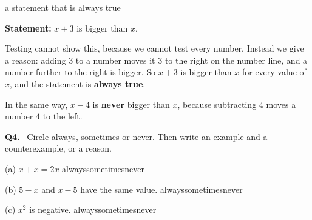 \documentclass[14pt,a4paper]{extarticle}
\newcommand{\qn}[1]{\textbf{Q#1.}\ }
\newcommand{\gapstrut}{\rule[-1.5mm]{0pt}{7.5mm}}
\newcommand{\writeline}{\par\gapstrut\underline{\hspace{\linewidth}}\par}
\newcommand{\statement}[1]{\textbf{Statement:} #1\par}
\newcommand{\circleone}{\hfill always\qquad sometimes\qquad never\par}
\begin{document}
\begin{wex}{a statement that is always true}
\begin{minipage}[t]{0.55\linewidth}
\vspace{0pt}\raggedright
\statement{$x+3$ is bigger than $x$.}
Testing cannot show this, because we cannot test every number. Instead
we give a reason: adding $3$ to a number moves it $3$ to the right on
the number line, and a number further to the right is bigger. So $x+3$
is bigger than $x$ for every value of $x$, and the statement is
\textbf{always true}.
\end{minipage}\hfill
\begin{minipage}[t]{0.42\linewidth}
\vspace{14pt}
\centering
{}
\end{minipage}

\vspace{6pt}
In the same way, $x-4$ is \textbf{never} bigger than $x$, because
subtracting $4$ moves a number $4$ to the left.
\end{wex}

\vfill
\qn{4} Circle always, sometimes or never. Then write an example and a
counterexample, or a reason.

\vspace{6pt}
(a) $x+x=2x$ \circleone
\writeline

\vspace{6pt}
(b) $5-x$ and $x-5$ have the same value. \circleone
\writeline

\vspace{6pt}
(c) $x^2$ is negative. \circleone
\writeline
\end{document}
